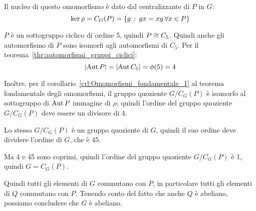\begin{soluzione}
    Il nucleo di questo omomorfismo è dato dal centralizzante di $P$ in $G$:
    \begin{equation*}
        \ker \rho = C_G(P) = \{g \,:\, gx = xg \,\forall x \in P\}
    \end{equation*}

    $P$ è un sottogruppo ciclico di ordine 5, quindi $P \cong C_5$.
    Quindi anche gli automorfismo di $P$ sono isomorfi agli automorfismi di $C_5$.
    Per il teorema~\ref{thr:automorfismi_gruppi_ciclici}:
    \begin{equation*}
        \lvert \operatorname{Aut} P \rvert = \lvert \operatorname{Aut} C_5 \rvert = \phi(5) = 4
    \end{equation*}

    Inoltre, per il corollario~\ref{crl:Omomorfismi_fondamentale_1} al teorema fondamentale degli omomorfismi,
    il gruppo quoziente $G/C_G(P)$ è isomorfo al sottogruppo di $\operatorname{Aut} P$ immagine di $\rho$;
    quindi l'ordine del gruppo quoziente $G/C_G(P)$ deve essere un divisore di 4.

    Lo stesso $G/C_G(P)$ è un gruppo quoziente di $G$, quindi il suo ordine deve dividere l'ordine di $G$, che è 45.

    Ma 4 e 45 sono coprimi, quindi l'ordine del gruppo quoziente $G/C_G(P)$ è 1, quindi $G = C_G(P)$.

    Quindi tutti gli elementi di $G$ commutano con $P$, in particolare tutti gli elementi di $Q$ commutano con $P$.
    Tenendo conto del fatto che anche $Q$ è abeliano, possiamo concludere che $G$ è abeliano.
\end{soluzione}